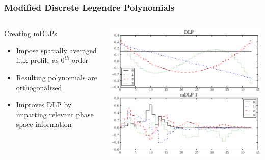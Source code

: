 \documentclass[fleqn]{beamer}
\begin{document}
  \begin{frame}
    \frametitle{Modified Discrete Legendre Polynomials}
    \begin{columns}[T]
      \begin{column}{0.4\textwidth}
	\begin{block}{Creating mDLPs}
	  \begin{itemize}
	    \item Impose spatially averaged flux profile as $0^{th}$ order
	    \item Resulting polynomials are orthogonalized
	    \item Improves DLP by imparting relevant phase space information
	  \end{itemize}
	\end{block}
      \end{column}
      \begin{column}{0.6\textwidth}
	\includegraphics[totalheight=.65\textheight]{mDLP}
      \end{column}
    \end{columns}
  \end{frame}
\end{document}
